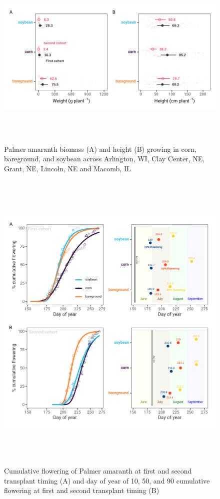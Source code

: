 \documentclass[utf8]{frontiersSCNS}
\begin{document}
\begin{figure}

{\centering \includegraphics[width=150mm,height=90mm]{../data analysis/figures/Figure 3} 

}

\caption{Palmer amaranth biomass (A) and height (B) growing in corn, bareground, and soybean across Arlington, WI, Clay Center, NE, Grant, NE, Lincoln, NE and Macomb, IL}\label{fig:Figure-3}
\end{figure}

\begin{figure}

{\centering \includegraphics[width=150mm,height=150mm]{../data analysis/figures/Figure 4} 

}

\caption{Cumulative flowering of Palmer amaranth at first and second transplant timing (A) and day of year of 10, 50, and 90 cumulative flowering at first and second transplant timing (B)}\label{fig:Figure-4}
\end{figure}
\end{document}
